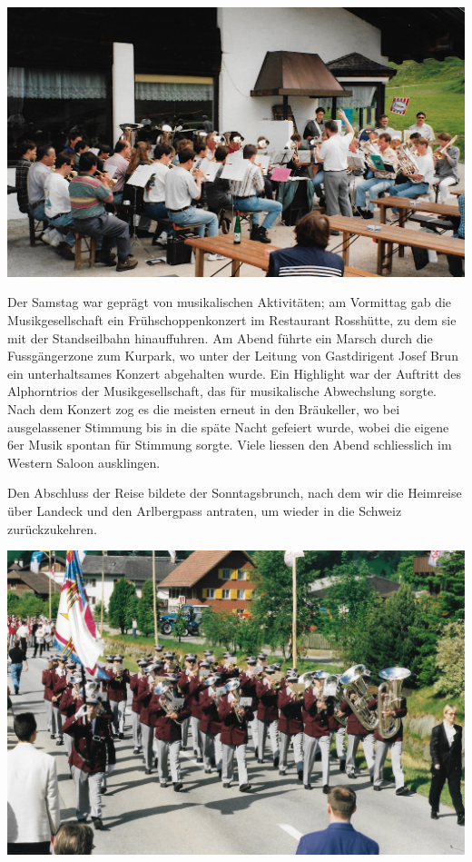 \begin{history}
    \begin{MulticolFigure}
        \centering
        \includegraphics[width=0.93\linewidth]{./chap/1975-2000/1997/MGH-Ausflug-Seefeld-1997-1.jpg}
    \end{MulticolFigure}

    Der Samstag war geprägt von musikalischen Aktivitäten; am Vormittag gab die
    Musikgesellschaft ein Frühschoppenkonzert im Restaurant Rosshütte, zu dem
    sie mit der Standseilbahn hinauffuhren. Am Abend führte ein Marsch durch die
    Fussgängerzone zum Kurpark, wo unter der Leitung von Gastdirigent Josef Brun
    ein unterhaltsames Konzert abgehalten wurde. Ein Highlight war der Auftritt
    des Alphorntrios der Musikgesellschaft, das für musikalische Abwechslung
    sorgte. Nach dem Konzert zog es die meisten erneut in den Bräukeller, wo bei
    ausgelassener Stimmung bis in die späte Nacht gefeiert wurde, wobei die
    eigene 6er Musik spontan für Stimmung sorgte. Viele liessen den Abend
    schliesslich im Western Saloon ausklingen.


    Den Abschluss der Reise bildete der Sonntagsbrunch, nach dem wir die
    Heimreise über Landeck und den Arlbergpass antraten, um wieder in die
    Schweiz zurückzukehren.

    \begin{MulticolFigure}
        \centering
        \includegraphics[width=0.85\linewidth]{./chap/1975-2000/1998/MGH-Musiktag-Hergiswil-1998.jpg}
    \end{MulticolFigure}

\end{history}

